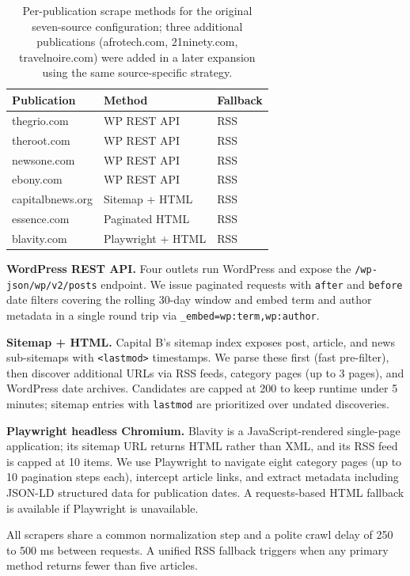 \documentclass[letterpaper]{article}
\begin{document}
\begin{table}[t]
\centering
\small
\begin{tabular}{lll}
\toprule
Publication & Method & Fallback \\
\midrule
thegrio.com      & WP REST API       & RSS \\
theroot.com      & WP REST API       & RSS \\
newsone.com      & WP REST API       & RSS \\
ebony.com        & WP REST API       & RSS \\
capitalbnews.org & Sitemap + HTML    & RSS \\
essence.com      & Paginated HTML    & RSS \\
blavity.com      & Playwright + HTML & RSS \\
\bottomrule
\end{tabular}
\caption{Per-publication scrape methods for the original seven-source
configuration; three additional publications (afrotech.com,
21ninety.com, travelnoire.com) were added in a later expansion using the
same source-specific strategy.}
\label{tab:sources}
\end{table}

\textbf{WordPress REST API.} Four outlets run WordPress and expose the
\texttt{/wp-json/wp/v2/posts} endpoint. We issue paginated requests with
\texttt{after} and \texttt{before} date filters covering the rolling
30-day window and embed term and author metadata in a single round trip
via \texttt{\_embed=wp:term,wp:author}.

\textbf{Sitemap + HTML.} Capital B's sitemap index exposes post,
article, and news sub-sitemaps with \texttt{<lastmod>} timestamps. We
parse these first (fast pre-filter), then discover additional URLs via
RSS feeds, category pages (up to 3 pages), and WordPress date archives.
Candidates are capped at 200 to keep runtime under 5 minutes; sitemap
entries with \texttt{lastmod} are prioritized over undated discoveries.

\textbf{Playwright headless Chromium.} Blavity is a JavaScript-rendered
single-page application; its sitemap URL returns HTML rather than XML,
and its RSS feed is capped at 10 items. We use Playwright to navigate
eight category pages (up to 10 pagination steps each), intercept
article links, and extract metadata including JSON-LD structured data
for publication dates. A requests-based HTML fallback is available if
Playwright is unavailable.

All scrapers share a common normalization step and a polite crawl delay
of 250 to 500 ms between requests. A unified RSS fallback triggers when
any primary method returns fewer than five articles.
\end{document}
